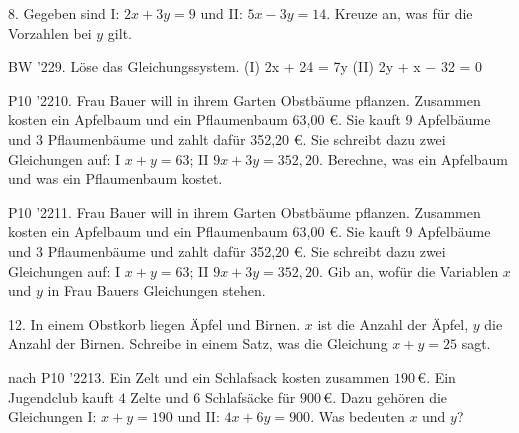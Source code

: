 \documentclass[11pt]{article}
\begin{document}
\pfgruppe{}
\begin{pfaufg}{}{8.}{}
Gegeben sind I: $2x + 3y = 9$ und II: $5x - 3y = 14$. Kreuze an, was für die Vorzahlen bei $y$ gilt.
\end{pfaufg}
\pfgruppe{}
\begin{pfaufg}{BW ’22}{9.}{}
Löse das Gleichungssystem. (I) 2x + 24 = 7y (II) 2y + x $-$ 32 = 0
\end{pfaufg}
\pfgruppe{}
\begin{pfaufg}{P10 ’22}{\llap{\textasteriskcentered\,}10.}{}
Frau Bauer will in ihrem Garten Obstbäume pflanzen. Zusammen kosten ein Apfelbaum und ein Pflaumenbaum 63,00 €. Sie kauft 9 Apfelbäume und 3 Pflaumenbäume und zahlt dafür 352,20 €. Sie schreibt dazu zwei Gleichungen auf: I $x + y = 63$; II $9x + 3y = 352{,}20$. Berechne, was ein Apfelbaum und was ein Pflaumenbaum kostet.
\end{pfaufg}
\pfgruppe{}
\begin{pfaufg}{P10 ’22}{11.}{}
Frau Bauer will in ihrem Garten Obstbäume pflanzen. Zusammen kosten ein Apfelbaum und ein Pflaumenbaum 63,00 €. Sie kauft 9 Apfelbäume und 3 Pflaumenbäume und zahlt dafür 352,20 €. Sie schreibt dazu zwei Gleichungen auf: I $x + y = 63$; II $9x + 3y = 352{,}20$. Gib an, wofür die Variablen $x$ und $y$ in Frau Bauers Gleichungen stehen.
\end{pfaufg}
\pfgruppe{}
\begin{pfaufg}{}{12.}{}
In einem Obstkorb liegen Äpfel und Birnen. $x$ ist die Anzahl der Äpfel, $y$ die Anzahl der Birnen. Schreibe in einem Satz, was die Gleichung $x + y = 25$ sagt.
\end{pfaufg}
\begin{pfaufg}{nach P10 ’22}{13.}{}
Ein Zelt und ein Schlafsack kosten zusammen $190\,€$. Ein Jugendclub kauft $4$ Zelte und $6$ Schlafsäcke für $900\,€$. Dazu gehören die Gleichungen I: $x + y = 190$ und II: $4x + 6y = 900$. Was bedeuten $x$ und $y$?
\end{pfaufg}
\end{document}
